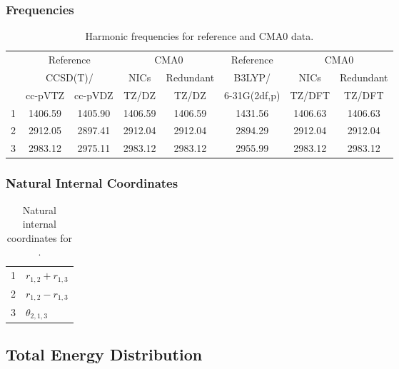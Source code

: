 \documentclass[10pt,oneside]{article}
\begin{document}
\begin{table}[h!]
\subsubsection*{Frequencies}
\centering
\caption{Harmonic frequencies for reference and CMA0 data.}
\begin{tabular}{cccccccc}
\toprule
{} & \multicolumn{2}{c}{Reference} & \multicolumn{2}{c}{CMA0} &    Reference & \multicolumn{2}{c}{CMA0} \\
{} & \multicolumn{2}{c}{CCSD(T)/} &    NICs &  Redundant &       B3LYP/ &    NICs & Redundant \\
{} &   cc-pVTZ & cc-pVDZ &   TZ/DZ &      TZ/DZ & 6-31G(2df,p) &  TZ/DFT &    TZ/DFT \\
\midrule
1 &   1406.59 & 1405.90 & 1406.59 &    1406.59 &      1431.56 & 1406.63 &   1406.63 \\
2 &   2912.05 & 2897.41 & 2912.04 &    2912.04 &      2894.29 & 2912.04 &   2912.04 \\
3 &   2983.12 & 2975.11 & 2983.12 &    2983.12 &      2955.99 & 2983.12 &   2983.12 \\
\bottomrule
\end{tabular}
\end{table}

\begin{table}[h!]
\subsubsection*{Natural Internal Coordinates}
\centering
\caption{Natural internal coordinates for .}
\small
\begin{tabular}{ll}
\toprule
  1   & $r_{1,2} + r_{1,3}$ \\
  2   & $r_{1,2} - r_{1,3}$ \\
  3   & $\theta_{2,1,3}$ \\
\bottomrule
\end{tabular}
\end{table}

\begin{table}
\subsection*{Total Energy Distribution}
\centering\end{table}

\clearpage

\subsection{}
\end{document}
